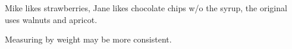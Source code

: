 \begin{variation}
\item Mike likes strawberries, Jane likes chocolate chips w/o the syrup, the
    original~\cite{joyofcooking2006} uses walnuts and apricot.
\end{variation}

\begin{experiments}
\item Measuring by weight may be more consistent.
\end{experiments}

\recipeend%
